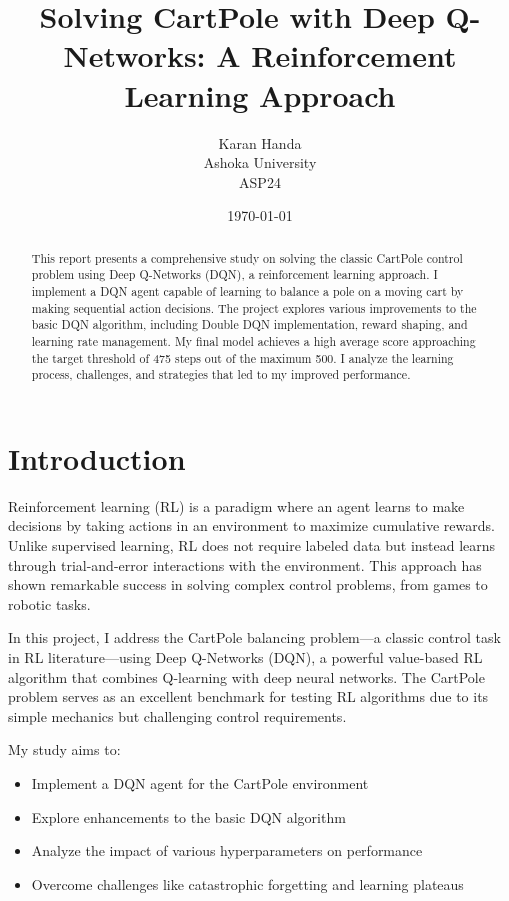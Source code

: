 \documentclass[11pt,a4paper]{article}
\title{Solving CartPole with Deep Q-Networks: A Reinforcement Learning Approach}
\author{Karan Handa \\ Ashoka University \\ ASP24}
\date{\today}
\begin{document}
\maketitle

\begin{abstract}
This report presents a comprehensive study on solving the classic CartPole control problem using Deep Q-Networks (DQN), a reinforcement learning approach. I implement a DQN agent capable of learning to balance a pole on a moving cart by making sequential action decisions. The project explores various improvements to the basic DQN algorithm, including Double DQN implementation, reward shaping, and learning rate management. My final model achieves a high average score approaching the target threshold of 475 steps out of the maximum 500. I analyze the learning process, challenges, and strategies that led to my improved performance.
\end{abstract}

\tableofcontents
\newpage

\section{Introduction}

Reinforcement learning (RL) is a paradigm where an agent learns to make decisions by taking actions in an environment to maximize cumulative rewards. Unlike supervised learning, RL does not require labeled data but instead learns through trial-and-error interactions with the environment. This approach has shown remarkable success in solving complex control problems, from games to robotic tasks.

In this project, I address the CartPole balancing problem—a classic control task in RL literature—using Deep Q-Networks (DQN), a powerful value-based RL algorithm that combines Q-learning with deep neural networks. The CartPole problem serves as an excellent benchmark for testing RL algorithms due to its simple mechanics but challenging control requirements.

My study aims to:
\begin{itemize}
    \item Implement a DQN agent for the CartPole environment
    \item Explore enhancements to the basic DQN algorithm
    \item Analyze the impact of various hyperparameters on performance
    \item Overcome challenges like catastrophic forgetting and learning plateaus
\end{itemize}
\end{document}
